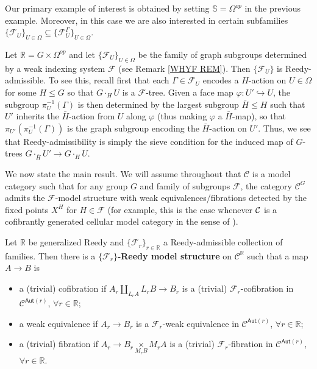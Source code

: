 \documentclass[a4paper,10pt
]{article}%
\begin{document}
Our primary example of interest is obtained by setting
$\mathbb{S} = \Omega^{op}$ in the previous example.
Moreover, in this case we are also interested 
in certain subfamilies
$\{\mathcal{F}_U\}_{U \in \Omega}
\subseteq
\{\mathcal{F}_U^{\Gamma}\}_{U \in \Omega}$.


\begin{example}\label{FGRAPHREEDY EX}
	Let $\mathbb{R} = G \times \Omega^{op}$ and let
	$\{\mathcal{F}_U\}_{U \in \Omega}$ be the family of graph subgroups determined by a weak indexing system $\mathcal{F}$ (see Remark \ref{WHYF REM}).
	Then $\{\mathcal{F}_U\}$ is Reedy-admissible.
	To see this, recall first that each $\Gamma \in \mathcal{F}_U$ encodes 
	a $H$-action on $U \in \Omega$ for some $H \leq G$
	so that $G \cdot_H U$ is a $\mathcal{F}$-tree.
	Given a face map $\varphi \colon U' \hookrightarrow U$, 
	the subgroup $\pi^{-1}_U(\Gamma)$ is then determined by the largest subgroup $\bar{H}\leq H$ such that 
	$U'$ inherits the $\bar{H}$-action from $U$ along $\varphi$ (thus making $\varphi$ a $\bar{H}$-map), 
	so that $\pi_{U'}(\pi^{-1}_U(\Gamma))$ is the graph subgroup encoding the $\bar{H}$-action on $U'$.
	Thus, we see that Reedy-admissibility is simply the sieve condition for the induced map of $G$-trees
	$G \cdot_{\bar{H}} U' \to G \cdot_H U$.
\end{example}


We now state the main result.
We will assume throughout that $\mathcal{C}$ is a model category such that for any group $G$ and family of subgroups $\mathcal{F}$,
the category $\mathcal{C}^G$ admits the
$\mathcal{F}$-model structure
with weak equivalences/fibrations detected by the fixed points
$X^H$ for $H \in \mathcal{F}$
(for example, this is the case whenever $\mathcal{C}$ is a cofibrantly generated cellular model category in the sense of \cite{Ste16}).


\begin{theorem}\label{REEDYADM THM}
Let $\mathbb{R}$ be generalized Reedy and 
$\{\mathcal{F}_r\}_{r \in \mathbb{R}}$ a Reedy-admissible collection of families. 
Then there is a \textbf{$\{\mathcal{F}_r\}$-Reedy model structure} on
$\mathcal{C}^{\mathbb{R}}$ such that a map $A \to B$ is
\begin{itemize}
  \item a (trivial) cofibration if $A_r \underset{L_r A}{\amalg}L_r B \to B_r$ is a (trivial) $\mathcal{F}_r$-cofibration in $\mathcal{C}^{\mathsf{Aut}(r)}$, $\forall r \in \mathbb{R}$;
	\item a weak equivalence if $A_r \to B_r$ is a $\mathcal{F}_r$-weak equivalence in $\mathcal{C}^{\mathsf{Aut}(r)}$, $\forall r \in \mathbb{R}$;
	\item a (trivial) fibration if $A_r \to B_r \underset{M_r B}{\times }M_r A $ is a (trivial) $\mathcal{F}_r$-fibration in $\mathcal{C}^{\mathsf{Aut}(r)}$, $\forall r \in \mathbb{R}$.
\end{itemize}
\end{theorem}
\end{document}
